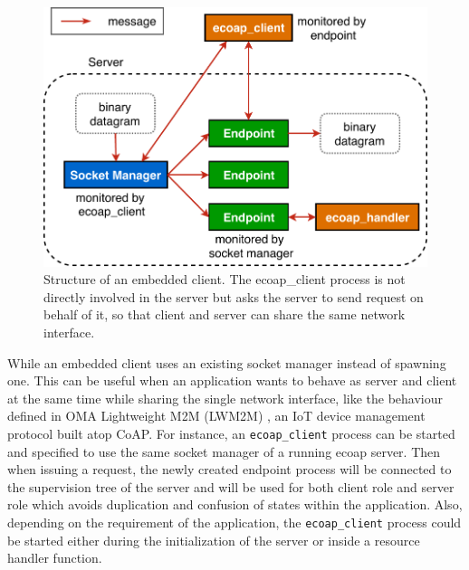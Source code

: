 \begin{figure}[!htbp]
\centering
\includegraphics[scale = 0.7]{ecoap_client_embedded}
\caption[Structure of an embedded client]{Structure of an embedded client. The ecoap\_client process is not directly involved in the server but asks the server to send request on behalf of it, so that client and server can share the same network interface.}
\label{fig:ecoap_client_embedded}
\end{figure}

While an embedded client uses an existing socket manager instead of spawning one. This can be useful when an application wants to behave as server and client at the same time while sharing the single network interface, like the behaviour defined in OMA Lightweight M2M (LWM2M) \autocite{lwm2m}, an IoT device management protocol built atop CoAP. For instance, an \verb|ecoap_client| process can be started and specified to use the same socket manager of a running ecoap server. Then when issuing a request, the newly created endpoint process will be connected to the supervision tree of the server and will be used for both client role and server role which avoids duplication and confusion of states within the application. Also, depending on the requirement of the application, the \verb|ecoap_client| process could be started either during the initialization of the server or inside a resource handler function.


